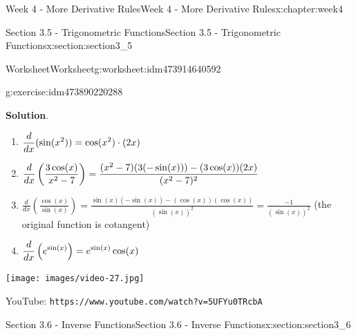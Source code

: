 \documentclass[oneside,10pt,]{book}
\newcommand{\blocktitlefont}{\relax}
\newcommand{\mono}[1]{\texttt{#1}}
\numberwithin{equation}{section}
\newlength{\qrsize}
\newlength{\previewwidth}
\begin{document}
\begin{chapterptx}{Week 4 - More Derivative Rules}{}{Week 4 - More Derivative Rules}{}{}{x:chapter:week4}
\begin{sectionptx}{Section 3.5 - Trigonometric Functions}{}{Section 3.5 - Trigonometric Functions}{}{}{x:section:section3_5}
\begin{worksheet-subsection}{Worksheet}{}{Worksheet}{}{}{g:worksheet:idm473914640592}
\begin{divisionexercise}{3}{}{}{g:exercise:idm473890220288}
\begin{enumerate}[label=(\alph*)]
\end{enumerate}
\textbf{\blocktitlefont Solution}.\hypertarget{g:solution:idm473890278064}{}\quad{}%
\begin{enumerate}[label=(\alph*)]
\item{}\(\displaystyle \displaystyle \frac{d}{dx} (\sin(x^2))= \cos(x^2)\cdot (2x)\)%
\item{}\(\displaystyle \displaystyle\frac{d}{dx} \left( \frac{3\cos(x)}{x^2-7}\right)= \frac{(x^2-7)(3(-\sin(x)))-(3\cos(x))(2x)}{(x^2-7)^2}\)%
\item{}\(\displaystyle\frac{d}{dx} \left( \frac{\cos(x)}{\sin(x)} \right) = \frac{\sin(x)(-\sin(x))-(\cos(x))(\cos(x))}{(\sin(x))^2} = \frac{-1}{(\sin(x))^2} \) (the original function is cotangent)%
\item{}\(\displaystyle \displaystyle\frac{d}{dx} \left( e^{\sin(x)} \right) = e^{\sin(x)}\cos(x)\)%
\end{enumerate}
\end{divisionexercise}%
\end{worksheet-subsection}
\restoregeometry
\setlength{\qrsize}{9em}
\setlength{\previewwidth}{\linewidth}
\addtolength{\previewwidth}{-\qrsize}
\begin{tcbraster}[raster columns=2, raster column skip=1pt, raster halign=center, raster force size=false, raster left skip=0pt, raster right skip=0pt]%
\begin{tcolorbox}[previewstyle, width=\previewwidth]%
\texttt{[image: images/video-27.jpg]}%
\end{tcolorbox}%
\begin{tcolorbox}[qrstyle]%
{\hypersetup{urlcolor=black}}%
\end{tcolorbox}%
\begin{tcolorbox}[captionstyle]%
\small YouTube: \mono{https://www.youtube.com/watch?v=5UFYu0TRcbA}\end{tcolorbox}%
\end{tcbraster}%
\end{sectionptx}
%
%
\typeout{************************************************}
\typeout{************************************************}
%
\begin{sectionptx}{Section 3.6 - Inverse Functions}{}{Section 3.6 - Inverse Functions}{}{}{x:section:section3_6}
\setlength{\qrsize}{9em}
\setlength{\previewwidth}{\linewidth}
\addtolength{\previewwidth}{-\qrsize}
\begin{tcbraster}[raster columns=2, raster column skip=1pt, raster halign=center, raster force size=false, raster left skip=0pt, raster right skip=0pt]%

\end{tcbraster}
\end{sectionptx}
\end{chapterptx}
\end{document}
